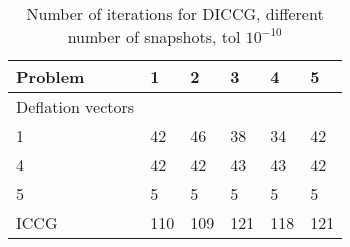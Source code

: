 \documentclass[a4paper,10pt]{article}
\begin{document}
\begin{table}[!]
\begin{tabular}{ |p{1.5cm}|p{1.5cm}|p{1.5cm}|p{1.5cm}|p{1.5cm}| p{1.5cm}| } 
 \hline
  Problem  & 1& 2 & 3& 4&5\\
  \hline
  Deflation vectors&&&&&\\
  \hline
  1 & 42 & 46&  38 &  34 &42 \\ 
   4 & 42 & 42&  43 &  43 &42 \\ 
  5 & 5 & 5&  5 &  5 &5 \\ 
ICCG & 110 & 109& 121 &  118&121 \\ 
\hline
\end{tabular}
\caption{Number of iterations for DICCG, different number of snapshots, tol $10^{-10}$}
\end{table}
\end{document}
